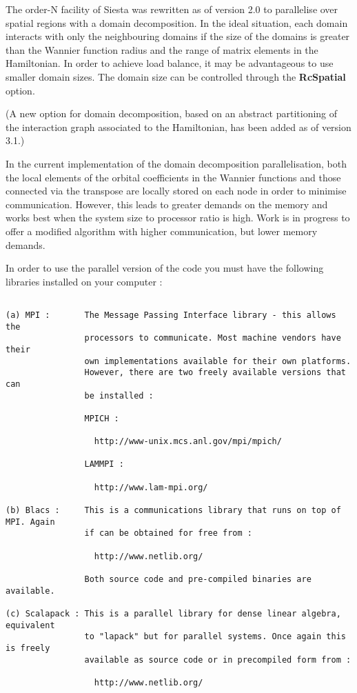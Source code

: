 \documentclass[11pt]{article}
\begin{document}
The order-N facility of {\sc Siesta} was rewritten as of version 2.0
to parallelise over spatial regions with a domain decomposition. In the
ideal situation, each domain interacts with only the neighbouring domains
if the size of the domains is greater than the Wannier function radius and
the range of matrix elements in the Hamiltonian. In order to achieve load
balance, it may be advantageous to use smaller domain sizes. The domain
size can be controlled through the {\bf RcSpatial} option.

(A new option for domain decomposition, based on an abstract
partitioning of the interaction graph associated to the Hamiltonian,
has been added as of version 3.1.)

In the current implementation of the domain decomposition parallelisation,
both the local elements of the orbital coefficients in the Wannier functions
and those connected via the transpose are locally stored on each node in order
to minimise communication. However, this leads to greater demands on the memory
and works best when the system size to processor ratio is high. Work is in
progress to offer a modified algorithm with higher communication, but lower
memory demands.

In order to use the parallel version of the code you must have the following
libraries installed on your computer :

\begin{verbatim}

(a) MPI :       The Message Passing Interface library - this allows the
                processors to communicate. Most machine vendors have their
                own implementations available for their own platforms.
                However, there are two freely available versions that can
                be installed :

                MPICH :

                  http://www-unix.mcs.anl.gov/mpi/mpich/

                LAMMPI :

                  http://www.lam-mpi.org/

(b) Blacs :     This is a communications library that runs on top of MPI. Again
                if can be obtained for free from :

                  http://www.netlib.org/

                Both source code and pre-compiled binaries are available.

(c) Scalapack : This is a parallel library for dense linear algebra, equivalent
                to "lapack" but for parallel systems. Once again this is freely
                available as source code or in precompiled form from :

                  http://www.netlib.org/

\end{verbatim}
\end{document}
